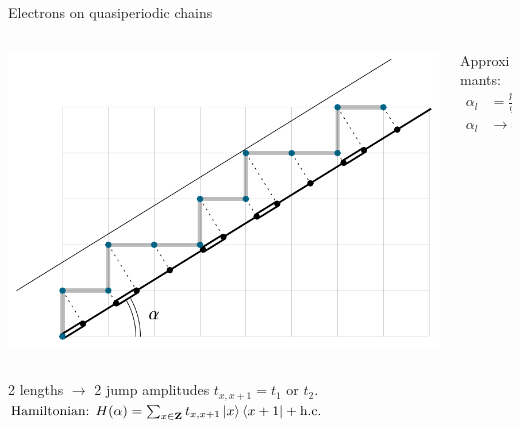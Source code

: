\documentclass[xcolor=x11names,compress,professionalfonts]{beamer}
\renewcommand{\(}{\begin{columns}}
\renewcommand{\)}{\end{columns}}
\newcommand{\<}[1]{\begin{column}{#1}}
\renewcommand{\>}{\end{column}}
\begin{document}
\begin{frame}{Electrons on quasiperiodic chains}
\begin{columns}
\begin{column}{8.5cm}
	\centering
	\includegraphics[scale=.7]{img/cut_and_project.pdf}
\end{column}

\begin{column}{3cm}
Approximants:
\begin{align*}
\alpha_l &= \frac{p_l}{q_l} \\
\alpha_l &\rightarrow \alpha
\end{align*}
\end{column}
\end{columns}

	2 lengths $\to$ 2 jump amplitudes $t_{x,x+1} = t_{1}$ or $t_2$.	
	$
		\text{Hamiltonian: } H(\alpha) = \sum_{x \in \mathbf{Z}} t_{x,x+1} \ket{x} \bra{x+1} + \text{h.c.}
	$
\end{frame}
\end{document}
